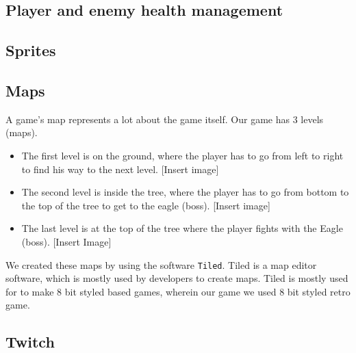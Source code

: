 \documentclass[12p]{article}
\begin{document}

\subsection{Player and enemy health management} \label{DocPlayerAndHealthManagement}


\subsection{Sprites} \label{DocSprites}


\subsection{Maps} \label{DocMaps}
A game's map represents a lot about the game itself. Our game has 3 levels (maps).

\begin{itemize}
  \item The first level is on the ground, where the player has to go from left to right to find his way to the next level. [Insert image]
  \item The second level is inside the tree, where the player has to go from bottom to the top of the tree to get to the eagle (boss). [Insert image]
  \item The last level is at the top of the tree where the player fights with the Eagle (boss). [Insert Image]
\end{itemize}

We created these maps by using the software \texttt{Tiled}. Tiled is a map editor software, which is mostly used by developers to create maps. Tiled is mostly used for to make 8 bit styled based games, wherein our game we used 8 bit styled retro game.


\subsection{Twitch} \label{Twitch}

\end{document}
